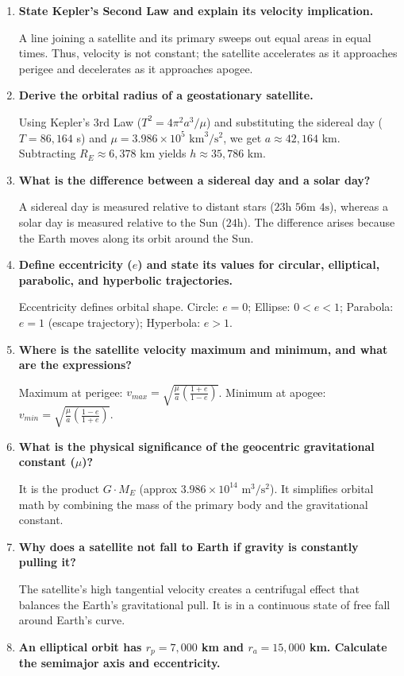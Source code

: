\documentclass[12pt,a4paper]{article}
\newcommand{\Q}[1]{\textbf{#1}\par\noindent\ignorespaces}
\begin{document}
\begin{tcolorbox}[exambox, title={\textbf{Frequently Asked / Viva Questions}}]
\begin{enumerate}[topsep=0pt, label=\textbf{Q\arabic*.}, itemsep=5pt]
  \item \Q{State Kepler's Second Law and explain its velocity implication.}
    A line joining a satellite and its primary sweeps out equal areas in equal times. Thus, velocity is not constant; the satellite accelerates as it approaches perigee and decelerates as it approaches apogee.
  \item \Q{Derive the orbital radius of a geostationary satellite.}
    Using Kepler's 3rd Law ($T^2 = 4\pi^2 a^3/\mu$) and substituting the sidereal day ($T = 86,164$ s) and $\mu = 3.986 \times 10^5 \text{ km}^3/\text{s}^2$, we get $a \approx 42,164$ km. Subtracting $R_E \approx 6,378$ km yields $h \approx 35,786$ km.
  \item \Q{What is the difference between a sidereal day and a solar day?}
    A sidereal day is measured relative to distant stars ($23\text{h }56\text{m }4\text{s}$), whereas a solar day is measured relative to the Sun ($24\text{h}$). The difference arises because the Earth moves along its orbit around the Sun.
  \item \Q{Define eccentricity ($e$) and state its values for circular, elliptical, parabolic, and hyperbolic trajectories.}
    Eccentricity defines orbital shape. Circle: $e = 0$; Ellipse: $0 < e < 1$; Parabola: $e = 1$ (escape trajectory); Hyperbola: $e > 1$.
  \item \Q{Where is the satellite velocity maximum and minimum, and what are the expressions?}
    Maximum at perigee: $v_{max} = \sqrt{\frac{\mu}{a}\left(\frac{1+e}{1-e}\right)}$. Minimum at apogee: $v_{min} = \sqrt{\frac{\mu}{a}\left(\frac{1-e}{1+e}\right)}$.
  \item \Q{What is the physical significance of the geocentric gravitational constant ($\mu$)?}
    It is the product $G \cdot M_E$ (approx $3.986 \times 10^{14} \text{ m}^3/\text{s}^2$). It simplifies orbital math by combining the mass of the primary body and the gravitational constant.
  \item \Q{Why does a satellite not fall to Earth if gravity is constantly pulling it?}
    The satellite's high tangential velocity creates a centrifugal effect that balances the Earth's gravitational pull. It is in a continuous state of free fall around Earth's curve.
  \item \Q{An elliptical orbit has $r_p = 7,000$ km and $r_a = 15,000$ km. Calculate the semimajor axis and eccentricity.}

\end{enumerate}
\end{tcolorbox}
\end{document}
